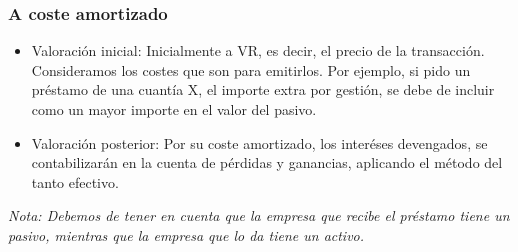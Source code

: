 \subsubsection{A coste amortizado}
\begin{itemize}
    \item Valoración inicial: Inicialmente a VR, es decir, el precio de la transacción. Consideramos los costes que son para emitirlos. Por ejemplo, si pido un préstamo de una cuantía X, el importe extra por gestión, se debe de incluir como un mayor importe en el valor del pasivo.
    \item Valoración posterior: Por su coste amortizado, los interéses devengados, se contabilizarán en la cuenta de pérdidas y ganancias, aplicando el método del tanto efectivo.
\end{itemize}

\textit{Nota: Debemos de tener en cuenta que la empresa que recibe el préstamo tiene un pasivo, mientras que la empresa que lo da tiene un activo.}

